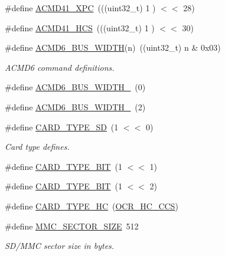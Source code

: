 \begin{DoxyCompactItemize}
\item 
\#define \hyperlink{group___c_h_i_p___s_d_m_m_c___definitions_gae797900d982a74d8d4a0ddcce87aad34}{A\+C\+M\+D41\+\_\+\+X\+PC}~(((uint32\+\_\+t) 1 ) $<$$<$ 28)
\item 
\#define \hyperlink{group___c_h_i_p___s_d_m_m_c___definitions_gad46a44a7d512d77fdef4b897604e90ba}{A\+C\+M\+D41\+\_\+\+H\+CS}~(((uint32\+\_\+t) 1 ) $<$$<$ 30)
\item 
\#define \hyperlink{group___c_h_i_p___s_d_m_m_c___definitions_gafcd7c0eb796e264b2c9161fbd360eeed}{A\+C\+M\+D6\+\_\+\+B\+U\+S\+\_\+\+W\+I\+D\+TH}(n)~((uint32\+\_\+t) n \& 0x03)
\begin{DoxyCompactList}\small\item\em A\+C\+M\+D6 command definitions. \end{DoxyCompactList}\item 
\#define \hyperlink{group___c_h_i_p___s_d_m_m_c___definitions_ga6623cf2f7bb207d8e60b17250114b4a6}{A\+C\+M\+D6\+\_\+\+B\+U\+S\+\_\+\+W\+I\+D\+T\+H\+\_}~(0)
\item 
\#define \hyperlink{group___c_h_i_p___s_d_m_m_c___definitions_gac83bf2925fef4fbbc080efd19c0b2072}{A\+C\+M\+D6\+\_\+\+B\+U\+S\+\_\+\+W\+I\+D\+T\+H\+\_}~(2)
\item 
\#define \hyperlink{group___c_h_i_p___s_d_m_m_c___definitions_ga36890c0bca39ec6ba4059fc7d993933a}{C\+A\+R\+D\+\_\+\+T\+Y\+P\+E\+\_\+\+SD}~(1 $<$$<$ 0)
\begin{DoxyCompactList}\small\item\em Card type defines. \end{DoxyCompactList}\item 
\#define \hyperlink{group___c_h_i_p___s_d_m_m_c___definitions_ga5e3721f2c92525902cf5368334d1fc44}{C\+A\+R\+D\+\_\+\+T\+Y\+P\+E\+\_\+B\+IT}~(1 $<$$<$ 1)
\item 
\#define \hyperlink{group___c_h_i_p___s_d_m_m_c___definitions_ga101a084bfe587c35caf97a60c9490632}{C\+A\+R\+D\+\_\+\+T\+Y\+P\+E\+\_\+B\+IT}~(1 $<$$<$ 2)
\item 
\#define \hyperlink{group___c_h_i_p___s_d_m_m_c___definitions_gac6c20853f3e658902a0410c8f71f1946}{C\+A\+R\+D\+\_\+\+T\+Y\+P\+E\+\_\+\+HC}~(\hyperlink{group___c_h_i_p___s_d_m_m_c___definitions_gad55c91f9dd1f79cc0e96644f478ca2e7}{O\+C\+R\+\_\+\+H\+C\+\_\+\+C\+CS})
\item 
\#define \hyperlink{group___c_h_i_p___s_d_m_m_c___definitions_ga502a0143be4c303f3006c0888e1cec82}{M\+M\+C\+\_\+\+S\+E\+C\+T\+O\+R\+\_\+\+S\+I\+ZE}~512
\begin{DoxyCompactList}\small\item\em S\+D/\+M\+MC sector size in bytes. \end{DoxyCompactList}\item 
$$
\end{DoxyCompactItemize}
